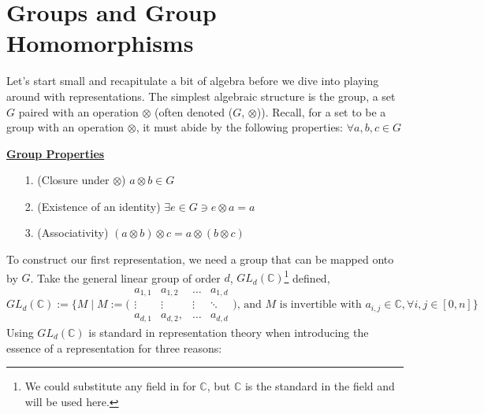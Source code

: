 \documentclass[11pt]{book}
\begin{document}
\newpage

\section{Groups and Group Homomorphisms}
Let's start small and recapitulate a bit of algebra before we dive into playing around with representations.
The simplest algebraic structure is the group, a set $G$ paired with an operation $\otimes$ (often denoted ($G$, $\otimes$)). 
Recall, for a set to be a group with an operation $\otimes$, it must abide by the following properties: $\forall a,b, c \in G$\\
\begin{defin}
	\begin{center}
		\underline{\textbf{Group Properties}}
		\begin{enumerate}
			\item[1.] (Closure under $\otimes$) $a \otimes b \in G$\\
			\item[2.] (Existence of an identity) $\exists e \in G \ni e \otimes a = a$\\
			\item[3.] (Associativity) $(a \otimes b) \otimes c = a \otimes (b \otimes c)$\\
		\end{enumerate}
	\end{center}
\end{defin}
To construct our first representation, we need a group that can be mapped onto by $G$. Take the general linear group of order $d$, $GL_d(\mathbb{C})$\footnote{
We could substitute any field in for $\mathbb{C}$, but $\mathbb{C}$ is the standard in the field and will be used here.} defined,
$$GL_d(\mathbb{C}) := \Bigg\{M \mid M := \Bigg(\begin{matrix} a_{1,1} & a_{1,2} & \dots & a_{1,d}\\ \vdots & \vdots & \vdots & \ddots\\ a_{d,1} & a_{d, 2},
	& \dots & a_{d,d}\end{matrix}\Bigg) \text{, and $M$ is invertible with } a_{i,j} \in \mathbb{C}, \forall i,j \in [0,n]\Bigg\} $$
Using $GL_d(\mathbb{C})$ is standard in representation theory when introducing the essence of a representation for three reasons:
\end{document}

